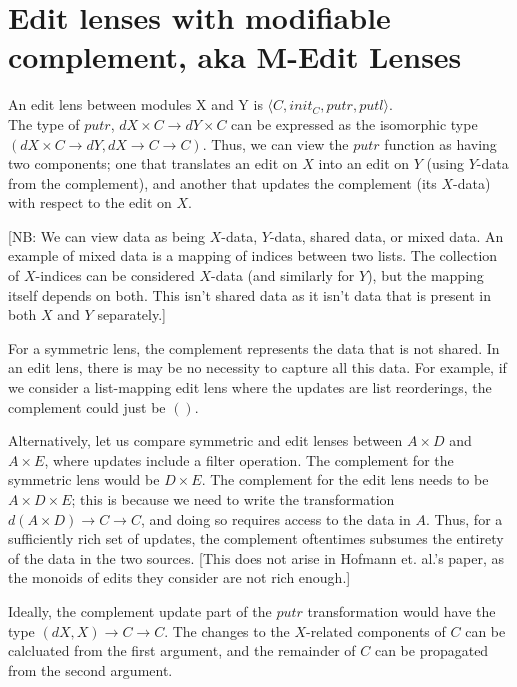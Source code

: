 \documentclass[a4paper,10pt]{article}
\title{}
\author{}
\begin{document}
\maketitle

\section{Edit lenses with modifiable complement, aka M-Edit Lenses}
An edit lens between modules X and Y is $\langle C, init_C, putr, putl \rangle$. \\
The type of $putr$, $dX \times C \to dY \times C$ can be expressed as the isomorphic type $(dX \times C \to dY, dX \to C \to C)$. Thus, we can view the $putr$ function as having two components; one that translates an edit on $X$ into an edit on $Y$ (using $Y$-data from the complement), and another that updates the complement (its $X$-data) with respect to the edit on $X$.

[NB: We can view data as being $X$-data, $Y$-data, shared data, or mixed data. An example of mixed data is a mapping of indices between two lists. The collection of $X$-indices can be considered $X$-data (and similarly for $Y$), but the mapping itself depends on both. This isn't shared data as it isn't data that is present in both $X$ and $Y$ separately.]

For a symmetric lens, the complement represents the data that is not shared. In an edit lens, there is may be no necessity to capture all this data. For example, if we consider a list-mapping edit lens where the updates are list reorderings, the complement could just be $()$. 

Alternatively, let us compare symmetric and edit lenses between $A \times D$ and $A \times E$, where updates include a filter operation. The complement for the symmetric lens would be $D \times E$. 
The complement for the edit lens needs to be $A \times D \times E$; this is because we need to write the transformation $d(A \times D) \to C \to C$, and doing so requires access to the data in $A$. 
Thus, for a sufficiently rich set of updates, the complement oftentimes subsumes the entirety of the data in the two sources.
[This does not arise in Hofmann et. al.'s paper, as the monoids of edits they consider are not rich enough.]

Ideally, the complement update part of the $putr$ transformation would have the type $(dX, X) \to C \to C$. The changes to the $X$-related components of $C$ can be calcluated from the first argument, and the remainder of $C$ can be propagated from the second argument. 
\end{document}

